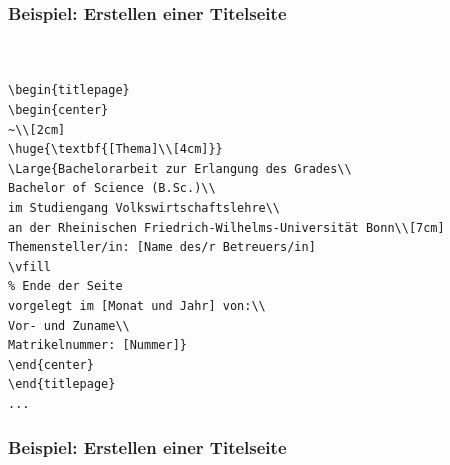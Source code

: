 \begin{frame}[fragile,t]
\frametitle{Beispiel: Erstellen einer Titelseite}
{\scriptsize
\begin{lstlisting}[style=latex]


\begin{titlepage}
\begin{center}
~\\[2cm]
\huge{\textbf{[Thema]\\[4cm]}}
\Large{Bachelorarbeit zur Erlangung des Grades\\
Bachelor of Science (B.Sc.)\\
im Studiengang Volkswirtschaftslehre\\
an der Rheinischen Friedrich-Wilhelms-Universität Bonn\\[7cm]
Themensteller/in: [Name des/r Betreuers/in]
\vfill
% Ende der Seite
vorgelegt im [Monat und Jahr] von:\\
Vor- und Zuname\\
Matrikelnummer: [Nummer]}
\end{center}
\end{titlepage}
...
\end{lstlisting}}
\end{frame}

\begin{frame}[fragile,t]
\frametitle{Beispiel: Erstellen einer Titelseite}
\begin{center}
\end{center}
\end{frame}


